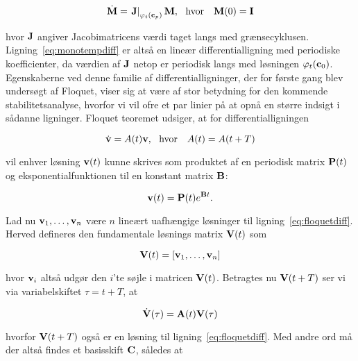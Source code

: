 \begin{equation}
 \dot{{\bf M}} = \left.{\bf J}\right|_{\varphi_t({\bf c}_p)} {\bf M}, 
 \mbox{\ \ hvor \ \ } {\bf M}(0) = {\bf I}
 \label{eq:monodiff}
\end{equation}

hvor ${\bf J}$ angiver Jacobimatricens v{\ae}rdi taget
langs med gr{\ae}nsecyklusen.
Lig\-ning~\ref{eq:monotempdiff} er alts{\aa} en line{\ae}r
differentiallig\-ning med periodiske koefficienter, da
v{\ae}rdien af ${\bf J}$ netop er periodisk langs med
l{\o}sningen $\varphi_t({\bf c}_0)$. Egenskaberne ved denne
familie af differentiallig\-ninger, der for f{\o}rste gang
blev unders{\o}gt af Floquet, viser sig at v{\ae}re af stor
betydning for den kommende stabilitetsana\-lyse, hvorfor vi
vil ofre et par linier p{\aa} at opn{\aa} en st{\o}rre
indsigt i s{\aa}danne lig\-ninger. Floquet teoremet
udsiger, at for differentiallig\-ningen

\begin{equation}
 \dot{\bf v} = A(t){\bf v}, \mbox{\ \ hvor \ \ }
 A(t) = A(t+T)
 \label{eq:floquetdiff}
\end{equation}

vil enhver l{\o}sning ${\bf v}(t)$ kunne skrives som
produktet af en periodisk matrix ${\bf P}(t)$ og
eksponentialfunktionen til en konstant matrix ${\bf B}$:

\begin{equation}
 {\bf v}(t) = {\bf P}(t) e^{{\bf B}t}.
\end{equation}

Lad nu ${\bf v}_1,\ldots,{\bf v}_n$ v{\ae}re $n$
line{\ae}rt uafh{\ae}ngige l{\o}sninger til
lig\-ning~\ref{eq:floquetdiff}. Herved defineres den
fundamentale l{\o}snings matrix ${\bf V}(t)$ som

\begin{equation}
{\bf V}(t) = \left[{\bf v}_1,\ldots,{\bf v}_n\right]
\end{equation}

hvor ${\bf v}_i$ alts{\aa} udg{\o}r den $i$'te s{\o}jle i
matricen ${\bf V}(t)$. Betragtes nu ${\bf V}(t+T)$ ser vi
via variabelskiftet $\tau=t+T$, at

\begin{equation}
\dot{\bf V}(\tau) = {\bf A}(t) {\bf V}(\tau)
\end{equation}

hvorfor ${\bf V}(t+T)$ ogs{\aa} er en l{\o}sning til
lig\-ning~\ref{eq:floquetdiff}. Med andre ord m{\aa} der
alts{\aa} findes et basisskift ${\bf C}$, s{\aa}ledes at

